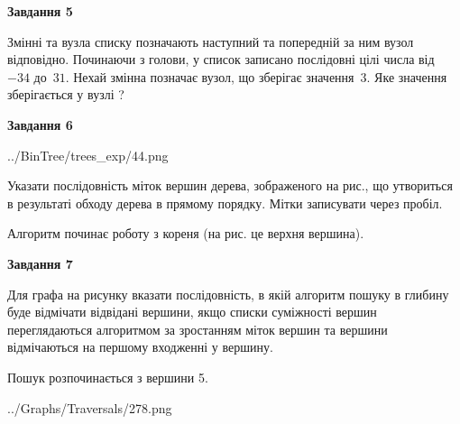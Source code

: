 \documentclass[12pt, ukrainian]{article}
\begin{document}
{\begin {large}
{\begin {center}\textbf{Завдання 5}\end {center}}\par
Змінні  та  вузла списку позначають наступний та попередній за ним вузол відповідно. Починаючи з голови, у список записано послідовні цілі числа від~$-34$ до~$31$. Нехай змінна  позначає вузол, що зберігає значення~$3$.
Яке значення зберігається у вузлі  ?\par
\newpage

{\begin {center}\textbf{Завдання 6}\end {center}}\par

\begin{center}
	{../BinTree/trees_exp/44.png}
\end{center}
Указати послідовність міток вершин дерева, зображеного на рис., що утвориться в результаті обходу дерева в прямому порядку. Мітки записувати через пробіл.\par Алгоритм починає роботу з кореня (на рис. це верхня вершина).\par
\newpage

{\begin {center}\textbf{Завдання 7}\end {center}}\par
Для графа на рисунку вказати послідовність, в якій алгоритм пошуку в глибину буде відмічати відвідані вершини, якщо списки суміжності вершин переглядаються алгоритмом за зростанням міток вершин та вершини відмічаються на першому вход\-женні у вершину.\par
Пошук розпочинається з вершини 5.\par

\begin{center}
	{../Graphs/Traversals/278.png}
\end{center}\par
\newpage


\end{large}}
\end{document}
